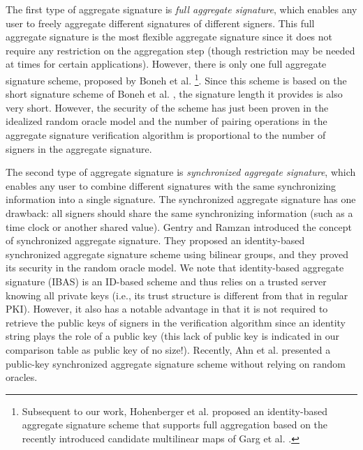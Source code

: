 \documentclass[11pt,letterpaper]{article}
\begin{document}
The first type of aggregate signature is \textit{full aggregate signature},
which enables any user to freely aggregate different signatures of different
signers. This full aggregate signature is the most flexible aggregate
signature since it does not require any restriction on the aggregation step
(though restriction may be needed at times for certain applications).
However, there is only one full aggregate signature scheme, proposed by Boneh
et al. \cite{BonehGLS03}\footnote{Subsequent to our work, Hohenberger et al.
\cite{HohenbergerSW13} proposed an identity-based aggregate signature scheme
that supports full aggregation based on the recently introduced candidate
multilinear maps of Garg et al. \cite{GargGH13}.}. Since this scheme is based
on the short signature scheme of Boneh et al. \cite{BonehLS01}, the signature
length it provides is also very short. However, the security of the scheme
has just been proven in the idealized random oracle model and the number of
pairing operations in the aggregate signature verification algorithm is
proportional to the number of signers in the aggregate signature.

The second type of aggregate signature is \textit{synchronized aggregate
signature}, which enables any user to combine different signatures with the
same synchronizing information into a single signature. The synchronized
aggregate signature has one drawback: all signers should share the same
synchronizing information (such as a time clock or another shared value).
Gentry and Ramzan \cite{GentryR06} introduced the concept of synchronized
aggregate signature. They proposed an identity-based synchronized aggregate
signature scheme using bilinear groups, and they proved its security in the
random oracle model. We note that identity-based aggregate signature (IBAS)
is an ID-based scheme and thus relies on a trusted server knowing all private
keys (i.e., its trust structure is different from that in regular PKI).
However, it also has a notable advantage in that it is not required to
retrieve the public keys of signers in the verification algorithm since an
identity string plays the role of a public key (this lack of public key is
indicated in our comparison table as public key of no size!). Recently, Ahn
et al. \cite{AhnGH10} presented a public-key synchronized aggregate signature
scheme without relying on random oracles.
\end{document}
